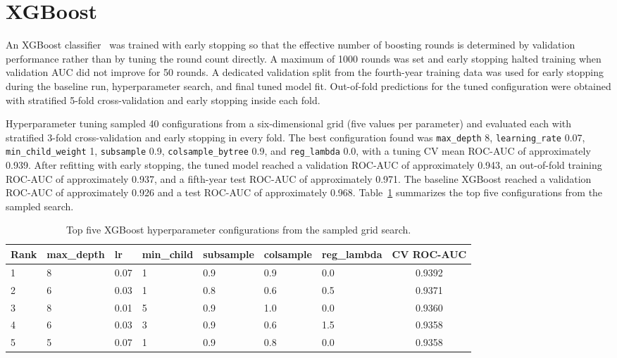\documentclass[11pt]{article}
\begin{document}
\section{XGBoost}

An XGBoost classifier~\cite{chen2016} was trained with early stopping so that the effective number of boosting rounds is determined by validation performance rather than by tuning the round count directly. A maximum of 1000 rounds was set and early stopping halted training when validation AUC did not improve for 50 rounds. A dedicated validation split from the fourth-year training data was used for early stopping during the baseline run, hyperparameter search, and final tuned model fit. Out-of-fold predictions for the tuned configuration were obtained with stratified 5-fold cross-validation and early stopping inside each fold.

Hyperparameter tuning sampled 40 configurations from a six-dimensional grid (five values per parameter) and evaluated each with stratified 3-fold cross-validation and early stopping in every fold. The best configuration found was \texttt{max\_depth} 8, \texttt{learning\_rate} 0.07, \texttt{min\_child\_weight} 1, \texttt{subsample} 0.9, \texttt{colsample\_bytree} 0.9, and \texttt{reg\_lambda} 0.0, with a tuning CV mean ROC-AUC of approximately 0.939. After refitting with early stopping, the tuned model reached a validation ROC-AUC of approximately 0.943, an out-of-fold training ROC-AUC of approximately 0.937, and a fifth-year test ROC-AUC of approximately 0.971. The baseline XGBoost reached a validation ROC-AUC of approximately 0.926 and a test ROC-AUC of approximately 0.968. Table~\ref{tab:xgb_tuning} summarizes the top five configurations from the sampled search.

\begin{table}[!htbp]
\centering
\caption{Top five XGBoost hyperparameter configurations from the sampled grid search.}
\label{tab:xgb_tuning}
\begin{tabular}{lllllllc}
\toprule
Rank & max\_depth & lr & min\_child & subsample & colsample & reg\_lambda & CV ROC-AUC \\
\midrule
1 & 8 & 0.07 & 1 & 0.9 & 0.9 & 0.0 & 0.9392 \\
2 & 6 & 0.03 & 1 & 0.8 & 0.6 & 0.5 & 0.9371 \\
3 & 8 & 0.01 & 5 & 0.9 & 1.0 & 0.0 & 0.9360 \\
4 & 6 & 0.03 & 3 & 0.9 & 0.6 & 1.5 & 0.9358 \\
5 & 5 & 0.07 & 1 & 0.9 & 0.8 & 0.0 & 0.9358 \\
\bottomrule
\end{tabular}
\end{table}
\FloatBarrier
\end{document}
